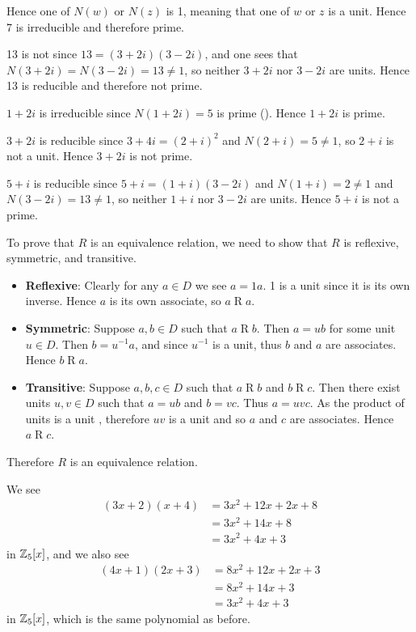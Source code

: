 \begin{questions}
\begin{partquestions}{\alph*}
        Hence one of $N(w)$ or $N(z)$ is 1, meaning that one of $w$ or $z$ is a unit. Hence 7 is irreducible and therefore prime.

        \item 13 is not since $13 = (3+2i)(3-2i)$, and one sees that $N(3+2i) = N(3-2i) = 13 \neq 1$, so neither $3+2i$ nor $3-2i$ are units. Hence 13 is reducible and therefore not prime.

        \item $1+2i$ is irreducible since $N(1+2i) = 5$ is prime (). Hence $1+2i$ is prime.

        \item $3+2i$ is reducible since $3+4i = (2+i)^2$ and $N(2+i) = 5 \neq 1$, so $2+i$ is not a unit. Hence $3+2i$ is not prime.

        \item $5+i$ is reducible since $5+i = (1+i)(3-2i)$ and $N(1+i) = 2 \neq 1$ and $N(3-2i) = 13 \neq 1$, so neither $1+i$ nor $3-2i$ are units. Hence $5+i$ is not a prime.
    \end{partquestions}

    \item To prove that $R$ is an equivalence relation, we need to show that $R$ is reflexive, symmetric, and transitive.
    \begin{itemize}
        \item \textbf{Reflexive}: Clearly for any $a \in D$ we see $a = 1a$. 1 is a unit since it is its own inverse. Hence $a$ is its own associate, so $a\mathrel{R}a$.

        \item \textbf{Symmetric}: Suppose $a,b \in D$ such that $a\mathrel{R}b$. Then $a = ub$ for some unit $u \in D$. Then $b = u^{-1}a$, and since $u^{-1}$ is a unit, thus $b$ and $a$ are associates. Hence $b\mathrel{R}a$.

        \item \textbf{Transitive}: Suppose $a,b,c\in D$ such that $a\mathrel{R}b$ and $b\mathrel{R}c$. Then there exist units $u,v \in D$ such that $a = ub$ and $b = vc$. Thus $a = uvc$. As the product of units is a unit , therefore $uv$ is a unit and so $a$ and $c$ are associates. Hence $a\mathrel{R}c$.
    \end{itemize}
    Therefore $R$ is an equivalence relation.

    \item We see
    \begin{align*}
        (3x+2)(x+4) &= 3x^2 + 12x + 2x + 8\\
        &= 3x^2 + 14x + 8\\
        &= 3x^2 + 4x + 3
    \end{align*}
    in $\mathbb{Z}_5[x]$, and we also see
    \begin{align*}
        (4x+1)(2x+3) &= 8x^2 + 12x + 2x + 3\\
        &= 8x^2 + 14x + 3\\
        &= 3x^2 + 4x + 3
    \end{align*}
    in $\mathbb{Z}_5[x]$, which is the same polynomial as before.


\end{questions}
